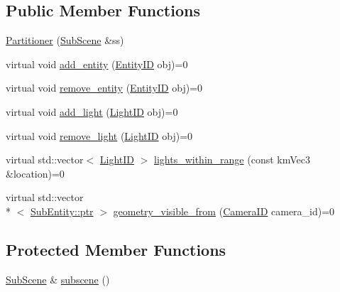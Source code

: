 \subsection*{Public Member Functions}
\begin{DoxyCompactItemize}
\item 
\hyperlink{classkglt_1_1_partitioner_ab2de6d5afedd698522445c00f372e162}{Partitioner} (\hyperlink{classkglt_1_1_sub_scene}{Sub\-Scene} \&ss)
\item 
virtual void \hyperlink{classkglt_1_1_partitioner_a18957be64dc23a3b82b4fc52b24dca14}{add\-\_\-entity} (\hyperlink{namespacekglt_a693458ae13c224ae3ea4074ac3a0b02a}{Entity\-I\-D} obj)=0
\item 
virtual void \hyperlink{classkglt_1_1_partitioner_a50a28bd91be670c57ef2a2a3af0a9417}{remove\-\_\-entity} (\hyperlink{namespacekglt_a693458ae13c224ae3ea4074ac3a0b02a}{Entity\-I\-D} obj)=0
\item 
virtual void \hyperlink{classkglt_1_1_partitioner_a23f9cb1a5d9660f1c0d8b3b67d9fb251}{add\-\_\-light} (\hyperlink{namespacekglt_ab90464803ef8e3c1f6da41388e859968}{Light\-I\-D} obj)=0
\item 
virtual void \hyperlink{classkglt_1_1_partitioner_ad5fec2d4fd9ee3eee608799f700808b7}{remove\-\_\-light} (\hyperlink{namespacekglt_ab90464803ef8e3c1f6da41388e859968}{Light\-I\-D} obj)=0
\item 
virtual std\-::vector$<$ \hyperlink{namespacekglt_ab90464803ef8e3c1f6da41388e859968}{Light\-I\-D} $>$ \hyperlink{classkglt_1_1_partitioner_a866fd1a90374d50061c6ba3dce4f7207}{lights\-\_\-within\-\_\-range} (const km\-Vec3 \&location)=0
\item 
virtual std\-::vector\\*
$<$ \hyperlink{class_managed_a59aa857eaf753735f65130812e98e9a9}{Sub\-Entity\-::ptr} $>$ \hyperlink{classkglt_1_1_partitioner_a4bc6f22e80046a34ccdb34392a74c83b}{geometry\-\_\-visible\-\_\-from} (\hyperlink{namespacekglt_a2a2b79f136b052b58ec737bd9c885429}{Camera\-I\-D} camera\-\_\-id)=0
\end{DoxyCompactItemize}
\subsection*{Protected Member Functions}
\begin{DoxyCompactItemize}
\item 
\hyperlink{classkglt_1_1_sub_scene}{Sub\-Scene} \& \hyperlink{classkglt_1_1_partitioner_ac5a6ab937bd1377ef7e632fb879b071f}{subscene} ()
\end{DoxyCompactItemize}
